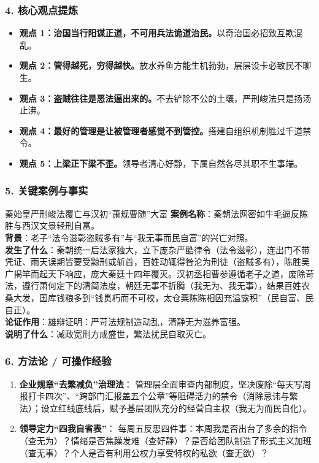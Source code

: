 \subsubsection{4. 核心观点提炼}
\begin{itemize}
    \item \textbf{观点 1：治国当行阳谋正道，不可用兵法诡道治民。}以奇治国必招致互欺混乱。
    \item \textbf{观点 2：管得越死，穷得越快。}放水养鱼方能生机勃勃，层层设卡必致民不聊生。
    \item \textbf{观点 3：盗贼往往是恶法逼出来的。}不去铲除不公的土壤，严刑峻法只是扬汤止沸。
    \item \textbf{观点 4：最好的管理是让被管理者感觉不到管控。}搭建自组织机制胜过千道禁令。
    \item \textbf{观点 5：上梁正下梁不歪。}领导者清心好静，下属自然各尽其职不生事端。
\end{itemize}

\subsubsection{5. 关键案例与事实}
\begin{CaseBox}{秦始皇严刑峻法覆亡与汉初“萧规曹随”大富}
\textbf{案例名称}：秦朝法网密如牛毛逼反陈胜与西汉文景轻刑自富。\\
\textbf{背景}：老子“法令滋彰盗贼多有”与“我无事而民自富”的兴亡对照。\\
\textbf{发生了什么}：秦朝统一后法家独大，立下庞杂严酷律令（法令滋彰），连出门不带凭证、雨天误期皆要受黥刑或斩首，百姓动辄得咎沦为刑徒（盗贼多有），陈胜吴广揭竿而起天下响应，庞大秦廷十四年覆灭。汉初丞相曹参遵循老子之道，废除苛法，遵行萧何定下的清简法度，朝廷无事不折腾（我无为、我无事），结果百姓农桑大发，国库钱粮多到“钱贯朽而不可校，太仓粟陈陈相因充溢露积”（民自富、民自正）。\\
\textbf{论证作用}：雄辩证明：严苛法规制造动乱，清静无为滋养富强。\\
\textbf{说明了什么}：减政宽刑方成盛世，繁法扰民自取灭亡。
\end{CaseBox}

\subsubsection{6. 方法论 / 可操作经验}
\begin{enumerate}
    \item \textbf{企业规章“去繁减负”治理法}：
    管理层全面审查内部制度，坚决废除“每天写周报打卡四次”、“跨部门汇报盖五个公章”等阻碍活力的禁令（消除忌讳与繁法）；设立红线底线后，赋予基层团队充分的经营自主权（我无为而民自化）。
    \item \textbf{领导定力“四我自省表”}：
    每周五反思四件事：本周我是否出台了多余的指令（查无为）？情绪是否焦躁发难（查好静）？是否给团队制造了形式主义加班（查无事）？个人是否有利用公权力享受特权的私欲（查无欲）？
\end{enumerate}

